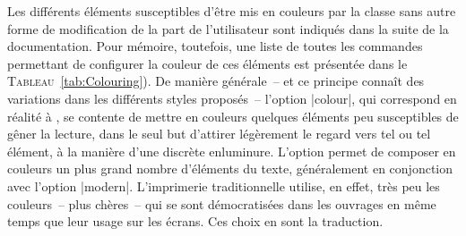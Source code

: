 Les différents éléments susceptibles d'être mis en couleurs par la classe sans autre forme de modification de la part de l'utilisateur sont indiqués dans la suite de la documentation. Pour mémoire, toutefois, une liste de toutes les commandes permettant de configurer la couleur de ces éléments est présentée dans le \textsc{Tableau}~\ref{tab:Colouring}). De manière générale~-- et ce principe connaît des variations dans les différents styles proposés~-- l'option |colour|, qui correspond en réalité à , se contente de mettre en couleurs quelques éléments peu susceptibles de gêner la lecture, dans le seul but d'attirer légèrement le regard vers tel ou tel élément, à la manière d'une discrète enluminure. L'option  permet de composer en couleurs un plus grand nombre d'éléments du texte, généralement en conjonction avec l'option |modern|. L'imprimerie traditionnelle utilise, en effet, très peu les couleurs~-- plus chères~-- qui se sont démocratisées dans les ouvrages en même temps que leur usage sur les écrans. Ces choix en sont la traduction.

